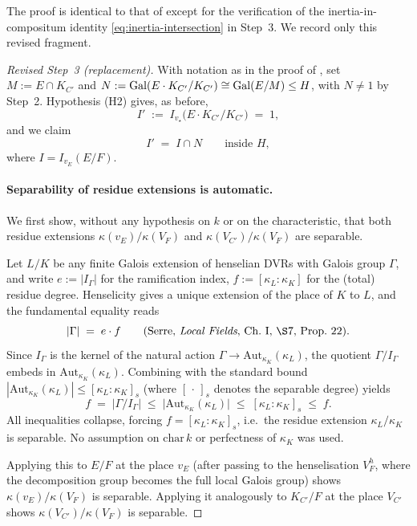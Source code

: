 \documentclass[11pt]{article}
\begin{document}
The proof is identical to that of  except for the
verification of the inertia-in-compositum identity
\eqref{eq:inertia-intersection} in Step~3.  We record only this revised
fragment.

\begin{proof}[Revised Step~3 (replacement)]
With notation as in the proof of , set
$M := E \cap K_{C'}$ and
$N := \operatorname{Gal}(E\cdot K_{C'}/K_{C'}) \cong \operatorname{Gal}(E/M) \leq H$, with $N \neq 1$
by Step~2.  Hypothesis (H2) gives, as before,
\[
I' \;:=\; I_{v_\star}\!\bigl(E\cdot K_{C'}/K_{C'}\bigr) \;=\; 1 ,
\]
and we claim
\begin{equation}\label{eq:inertia-intersection-2}
I' \;=\; I \cap N \qquad \text{inside } H ,
\end{equation}
where $I = I_{v_E}(E/F)$.

\paragraph{Separability of residue extensions is automatic.}
We first show, without any hypothesis on $k$ or on the characteristic, that
both residue extensions $\kappa(v_E)/\kappa(V_F)$ and
$\kappa(V_{C'})/\kappa(V_F)$ are separable.

Let $L/K$ be any finite Galois extension of henselian DVRs with Galois group
$\Gamma$, and write $e := |I_\Gamma|$ for the ramification index,
$f := [\kappa_L : \kappa_K]$ for the (total) residue degree.  Henselicity
gives a unique extension of the place of $K$ to $L$, and the fundamental
equality reads
\[
|\Gamma| \;=\; e \cdot f
\qquad\text{(Serre, \emph{Local Fields}, Ch.~I, \S7, Prop.~22).}
\]
Since $I_\Gamma$ is the kernel of the natural action
$\Gamma \to \mathrm{Aut}_{\kappa_K}(\kappa_L)$, the quotient $\Gamma/I_\Gamma$
embeds in $\mathrm{Aut}_{\kappa_K}(\kappa_L)$.  Combining with the standard
bound $|\mathrm{Aut}_{\kappa_K}(\kappa_L)| \leq [\kappa_L : \kappa_K]_s$
(where $[\,\cdot\,]_s$ denotes the separable degree) yields
\[
f \;=\; |\Gamma/I_\Gamma|
   \;\leq\; \bigl|\mathrm{Aut}_{\kappa_K}(\kappa_L)\bigr|
   \;\leq\; [\kappa_L : \kappa_K]_s
   \;\leq\; f .
\]
All inequalities collapse, forcing $f = [\kappa_L : \kappa_K]_s$, i.e.\ the
residue extension $\kappa_L/\kappa_K$ is separable.  No assumption on
$\mathrm{char}\,k$ or perfectness of $\kappa_K$ was used.

Applying this to $E/F$ at the place $v_E$ (after passing to the
henselisation $V_F^h$, where the decomposition group becomes the full local
Galois group) shows $\kappa(v_E)/\kappa(V_F)$ is separable.  Applying it
analogously to $K_{C'}/F$ at the place $V_{C'}$ shows
$\kappa(V_{C'})/\kappa(V_F)$ is separable.


\end{proof}
\end{document}
